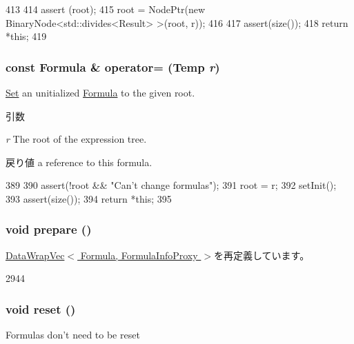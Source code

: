 \begin{DoxyCode}
413 {
414     assert (root);
415     root = NodePtr(new BinaryNode<std::divides<Result> >(root, r));
416 
417     assert(size());
418     return *this;
419 }
\end{DoxyCode}
\hypertarget{classStats_1_1Formula_a1b436830b3390f8a71ca2f460ef3e5b7}{
\subsubsection[{operator=}]{\setlength{\rightskip}{0pt plus 5cm}const {\bf Formula} \& operator= ({\bf Temp} {\em r})}}
\label{classStats_1_1Formula_a1b436830b3390f8a71ca2f460ef3e5b7}
\hyperlink{classSet}{Set} an unitialized \hyperlink{classStats_1_1Formula}{Formula} to the given root. 
\begin{DoxyParams}{引数}
\item[{\em r}]The root of the expression tree. \end{DoxyParams}
\begin{DoxyReturn}{戻り値}
a reference to this formula. 
\end{DoxyReturn}



\begin{DoxyCode}
389 {
390     assert(!root && "Can't change formulas");
391     root = r;
392     setInit();
393     assert(size());
394     return *this;
395 }
\end{DoxyCode}
\hypertarget{classStats_1_1Formula_a1825b40ca3bc3a1ba67fdb58fac5015c}{
\subsubsection[{prepare}]{\setlength{\rightskip}{0pt plus 5cm}void prepare ()}}
\label{classStats_1_1Formula_a1825b40ca3bc3a1ba67fdb58fac5015c}


\hyperlink{classStats_1_1DataWrapVec_a1825b40ca3bc3a1ba67fdb58fac5015c}{DataWrapVec$<$ Formula, FormulaInfoProxy $>$}を再定義しています。


\begin{DoxyCode}
2944 { }
\end{DoxyCode}
\hypertarget{classStats_1_1Formula_ad20897c5c8bd47f5d4005989bead0e55}{
\subsubsection[{reset}]{\setlength{\rightskip}{0pt plus 5cm}void reset ()}}
\label{classStats_1_1Formula_ad20897c5c8bd47f5d4005989bead0e55}
Formulas don't need to be reset 

